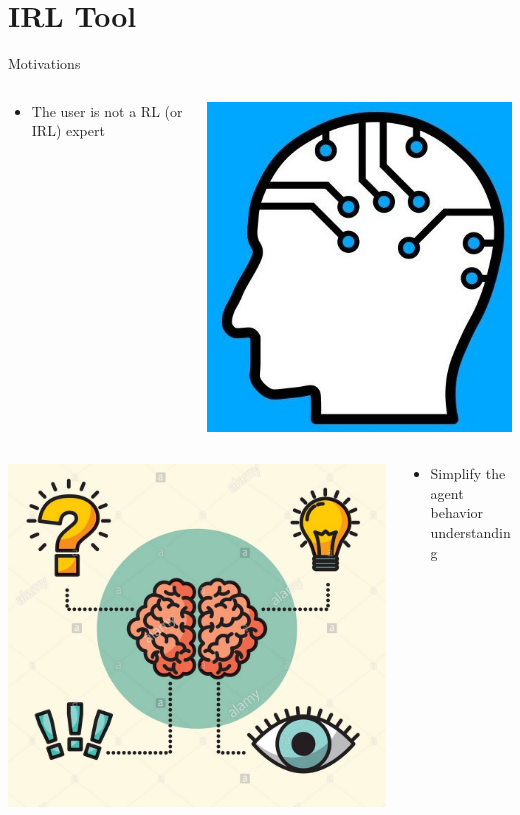 \section{IRL Tool}

\begin{frame}{Motivations}
	
	\begin{columns}
		\begin{column}{0.6\textwidth}
			
			\begin{itemize}
				\item The user is not a RL (or IRL) expert
			\end{itemize}
			
		\end{column}
		\begin{column}{0.4\textwidth}
			\centering
			\includegraphics[width=0.4\linewidth]{images/expertAI.jpg}	
		\end{column}
		
	\end{columns}

	\begin{columns}
		\begin{column}{0.4\textwidth}
			\centering
			\includegraphics[width=0.4\linewidth]{images/agent-beh.jpg}	
			
		\end{column}
		\begin{column}{0.6\textwidth}
			\begin{itemize}
				\item Simplify the agent behavior understanding
			\end{itemize}
		\end{column}
		

\end{columns}
\end{frame}
